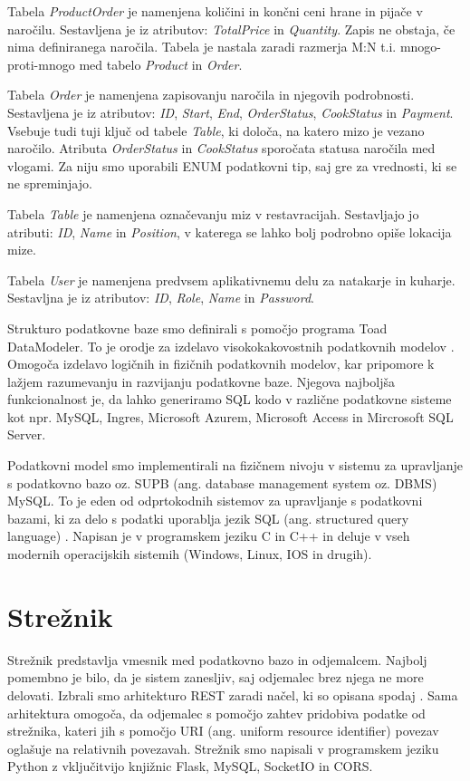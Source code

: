 \documentclass[a4paper, 12pt]{book}
\begin{document}
Tabela \textit{ProductOrder} je namenjena količini in končni ceni hrane in pijače v naročilu. Sestavljena je iz atributov: \textit{TotalPrice} in \textit{Quantity}. Zapis ne obstaja, če nima definiranega naročila. Tabela je nastala zaradi razmerja M:N t.i. mnogo-proti-mnogo med tabelo \textit{Product} in \textit{Order}.

Tabela \textit{Order} je namenjena zapisovanju naročila in njegovih podrobnosti. Sestavljena je iz atributov: \textit{ID}, \textit{Start}, \textit{End}, \textit{OrderStatus}, \textit{CookStatus} in \textit{Payment}. Vsebuje tudi tuji ključ od tabele \textit{Table}, ki določa, na katero mizo je vezano naročilo. Atributa \textit{OrderStatus} in \textit{CookStatus} sporočata statusa naročila med vlogami. Za niju smo uporabili ENUM podatkovni tip, saj gre za vrednosti, ki se ne spreminjajo.

Tabela \textit{Table} je namenjena označevanju miz v restavracijah. Sestavljajo jo atributi: \textit{ID}, \textit{Name} in \textit{Position}, v katerega se lahko bolj podrobno opiše lokacija mize.

Tabela \textit{User} je namenjena predvsem aplikativnemu delu za natakarje in kuharje. Sestavljna je iz atributov: \textit{ID}, \textit{Role}, \textit{Name} in \textit{Password}. 

Strukturo podatkovne baze smo definirali s pomočjo programa Toad DataModeler. To je orodje za izdelavo visokokakovostnih podatkovnih modelov \cite{Toad_Data_Modeler}. Omogoča izdelavo logičnih in fizičnih podatkovnih modelov, kar pripomore k lažjem razumevanju in razvijanju podatkovne baze. Njegova najboljša funkcionalnost je, da lahko generiramo SQL kodo v različne podatkovne sisteme kot npr. MySQL, Ingres, Microsoft Azurem, Microsoft Access in Mircrosoft SQL Server.

Podatkovni model smo implementirali na fizičnem nivoju v sistemu za upravljanje s podatkovno bazo oz. SUPB  (ang. database management system oz. DBMS) MySQL. To je eden od odprtokodnih sistemov za upravljanje s podatkovni bazami, ki za delo s podatki uporablja jezik SQL (ang. structured query language) \cite{MySQL}. Napisan je v programskem jeziku C in C++ in deluje v vseh modernih operacijskih sistemih (Windows, Linux, IOS in drugih).


\section{Strežnik}
Strežnik predstavlja vmesnik med podatkovno bazo in odjemalcem. Najbolj pomembno je bilo, da je sistem zanesljiv, saj odjemalec brez njega ne more delovati. Izbrali smo arhitekturo REST zaradi načel, ki so opisana spodaj \cite{RESTAPI}. Sama arhitektura omogoča, da odjemalec s pomočjo zahtev pridobiva podatke od strežnika, kateri jih s pomočjo URI (ang. uniform resource identifier) povezav oglašuje na relativnih povezavah. Strežnik smo napisali v programskem jeziku Python z vključitvijo knjižnic Flask, MySQL, SocketIO in CORS.
\end{document}
